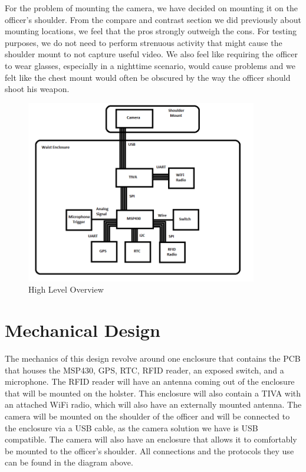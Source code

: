 \documentclass[12pt]{article}
\begin{document}
For the problem of mounting the camera, we have decided on mounting it on the
officer's shoulder. From the compare and contrast section we did previously
about mounting locations, we feel that the pros strongly outweigh the cons. For
testing purposes, we do not need to perform strenuous activity that might cause
the shoulder mount to not capture useful video. We also feel like requiring the
officer to wear glasses, especially in a nighttime scenario, would cause
problems and we felt like the chest mount would often be obscured by the way
the officer should shoot his weapon.

\begin{figure}[h!]
    \centering
    \includegraphics[width=0.9\textwidth]{overview}
    \caption{High Level Overview}
\end{figure}

\section{Mechanical Design}

The mechanics of this design revolve around one enclosure that contains the PCB
that houses the MSP430, GPS, RTC, RFID reader, an exposed switch, and a
microphone. The RFID reader will have an antenna coming out of the enclosure
that will be mounted on the holster. This enclosure will also contain a TIVA
with an attached WiFi radio, which will also have an externally mounted
antenna. The camera will be mounted on the shoulder of the officer and will be
connected to the enclosure via a USB cable, as the camera solution we have is
USB compatible. The camera will also have an enclosure that allows it to
comfortably be mounted to the officer’s shoulder. All connections and the
protocols they use can be found in the diagram above.
\end{document}
